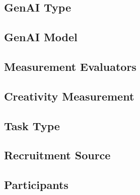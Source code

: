 \documentclass[manuscript, screen, review, acmsmall, anonymous]{acmart}
\begin{document}
\subsection{GenAI Type}
\begin{table}[H]
  \centering
  
\end{table}
\subsection{GenAI Model}
\begin{table}[H]
  \centering
  
\end{table}
\subsection{Measurement Evaluators}
\begin{table}[H]
  \centering
  
\end{table}
\subsection{Creativity Measurement}
\begin{table}[H]
  \centering
  
\end{table}
\subsection{Task Type}
\begin{table}[H]
  \centering
  
\end{table}
\subsection{Recruitment Source}
\begin{table}[H]
  \centering
  
\end{table}
\subsection{Participants}
\begin{table}[H]
  \centering
  
\end{table}
\end{document}
